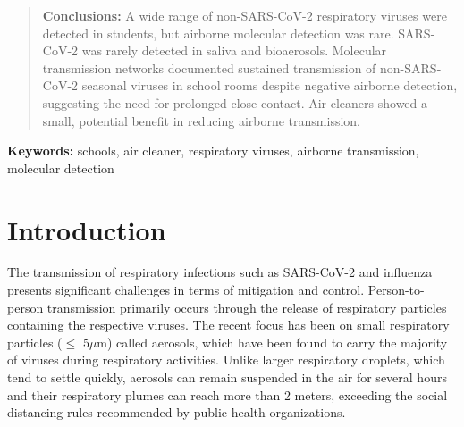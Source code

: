 \documentclass[fleqn,11pt]{wlscirep}
\begin{document}
\begin{abstract}

\noindent\textbf{Conclusions:} A wide range of non-SARS-CoV-2 respiratory viruses were detected in students, but airborne molecular detection was rare. SARS-CoV-2 was rarely detected in saliva and bioaerosols. Molecular transmission networks documented sustained transmission of non-SARS-CoV-2 seasonal viruses in school rooms despite negative airborne detection, suggesting the need for prolonged close contact. Air cleaners showed a small, potential benefit in reducing airborne transmission. 

\par
\end{abstract}


\flushbottom
\maketitle
\setcounter{page}{1}
\thispagestyle{fancy}

\vspace{2em}


\vspace{0.5em}

\noindent\textbf{Keywords:} schools, air cleaner, respiratory viruses, airborne transmission, molecular detection
\newpage

\sloppy
\raggedbottom

\newpage

\section{Introduction} 

The transmission of respiratory infections such as SARS-CoV-2 and influenza presents significant challenges in terms of mitigation and control. Person-to-person transmission primarily occurs through the release of respiratory particles containing the respective viruses. The recent focus has been on small respiratory particles ($\leq$ 5$\mu$m) called aerosols, which have been found to carry the majority of viruses during respiratory activities\cite{Fennelly2020}. Unlike larger respiratory droplets, which tend to settle quickly, aerosols can remain suspended in the air for several hours and their respiratory plumes can reach more than 2 meters\cite{Coleman2022,Wang2020,Heneghan2021}, exceeding the social distancing rules recommended by public health organizations\cite{Bazant2021PNAS,Trivedi2021PhyFluids,Lindsley2010CID}. 
\end{document}
